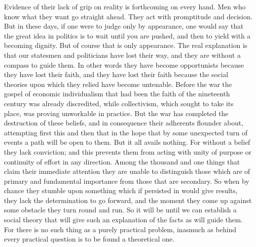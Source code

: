 \documentclass{book}
\begin{document}
Evidence of their lack of grip on reality is forthcoming on every hand. Men who know what they want go straight ahead. They act with promptitude and decision. But in these days, if one were to judge only by appearance, one would say that the great idea in politics is to wait until you are pushed, and then to yield with a becoming dignity. But of course that is only appearance. The real explanation is that our statesmen and politicians have lost their way, and they are without a compass to guide them. In other words they have become opportunists because they have lost their faith, and they have lost their faith because the social theories upon which they relied have become untenable. Before the war the gospel of economic individualism that had been the faith of the nineteenth century was already discredited, while collectivism, which sought to take its place, was proving unworkable in practice. But the war has completed the destruction of these beliefs, and in consequence their adherents flounder about, attempting first this and then that in the hope that by some unexpected turn of events a path will be open to them. But it all avails nothing. For without a belief they lack conviction; and this prevents them from acting with unity of purpose or continuity of effort in any direction. Among the thousand and one things that claim their immediate attention they are unable to distinguish those which are of primary and fundamental importance from those that are secondary. So when by chance they stumble upon something which if persisted in would give results, they lack the determination to go forward, and the moment they come up against some obstacle they turn round and run. So it will be until we can establish a social theory that will give such an explanation of the facts as will guide them. For there is no such thing as a purely practical problem, inasmuch as behind every practical question is to be found a theoretical one.
\end{document}
